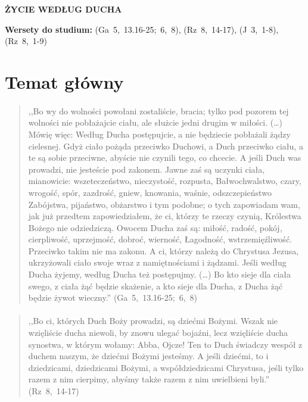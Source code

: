 \documentclass[10pt,a4paper,oneside]{article}
\begin{document}
\centerline{\textbf{\MakeUppercase{Życie według Ducha}}}
\begin{center}
\textbf{Wersety do studium:} 
\mbox{(Ga 5, 13.16-25; 6, 8)}, \mbox{(Rz 8, 14-17)}, \mbox{(J 3, 1-8)}, \mbox{(Rz 8, 1-9)}
\end{center}
\section{Temat główny}
\paragraph{}
\begin{quote}
,,Bo wy do wolności powołani zostaliście, bracia; tylko pod pozorem tej wolności nie pobłażajcie ciału, ale służcie jedni drugim w miłości. (\ldots) Mówię więc: Według Ducha postępujcie, a nie będziecie pobłażali żądzy cielesnej. Gdyż ciało pożąda przeciwko Duchowi, a Duch przeciwko ciału, a te są sobie przeciwne, abyście nie czynili tego, co chcecie. A jeśli Duch was prowadzi, nie jesteście pod zakonem. Jawne zaś są uczynki ciała, mianowicie: wszeteczeństwo, nieczystość, rozpusta, Bałwochwalstwo, czary, wrogość, spór, zazdrość, gniew, knowania, waśnie, odszczepieństwo Zabójstwa, pijaństwo, obżarstwo i tym podobne; o tych zapowiadam wam, jak już przedtem zapowiedziałem, że ci, którzy te rzeczy czynią, Królestwa Bożego nie odziedziczą. Owocem Ducha zaś są: miłość, radość, pokój, cierpliwość, uprzejmość, dobroć, wierność, Łagodność, wstrzemięźliwość. Przeciwko takim nie ma zakonu. A ci, którzy należą do Chrystusa Jezusa, ukrzyżowali ciało swoje wraz z namiętnościami i żądzami. Jeśli według Ducha żyjemy, według Ducha też postępujmy. (\ldots) Bo kto sieje dla ciała swego, z ciała żąć będzie skażenie, a kto sieje dla Ducha, z Ducha żąć będzie żywot wieczny.'' \mbox{(Ga 5, 13.16-25; 6, 8)}
\end{quote}
\paragraph{}
\begin{quote}
,,Bo ci, których Duch Boży prowadzi, są dziećmi Bożymi. Wszak nie wzięliście ducha niewoli, by znowu ulegać bojaźni, lecz wzięliście ducha synostwa, w którym wołamy: Abba, Ojcze! Ten to Duch świadczy wespół z duchem naszym, że dziećmi Bożymi jesteśmy. A jeśli dziećmi, to i dziedzicami, dziedzicami Bożymi, a współdziedzicami Chrystusa, jeśli tylko razem z nim cierpimy, abyśmy także razem z nim uwielbieni byli.'' \mbox{(Rz 8, 14-17)}
\end{quote}
\end{document}

